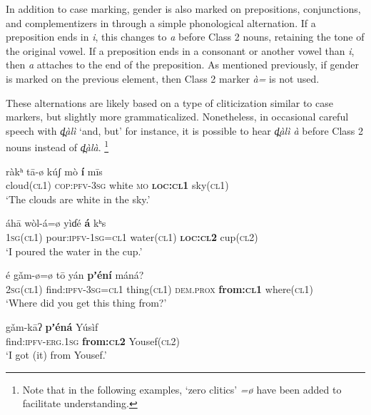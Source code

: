 \documentclass[output=collectionpaper,hidelinks]{langscibook}
\theoremstyle{remark}
\begin{document}
In addition to case marking, gender is also marked on prepositions,
conjunctions, and complementizers in  through a simple phonological
alternation.  If a preposition ends in \emph{i}, this changes to \emph{a} before
Class 2 nouns, retaining the tone of the original vowel.  If a preposition ends
in a consonant or another vowel than \emph{i}, then \emph{a} attaches to the end
of the preposition.  As mentioned previously, if gender is marked on the
previous element, then Class 2 marker \emph{à=} is not used.

These alternations are likely based on a type of cliticization similar to case
markers, but slightly more grammaticalized.  Nonetheless, in occasional careful
speech with \emph{d̪àlì} `and, but' for instance, it is possible to hear
\emph{d̪àlì à} before Class 2 nouns instead of \emph{d̪àlà}.%
\footnote{Note that in the following examples, `zero clitics' \textit{=ø} have been added to facilitate understanding.}

\ea
\gll  ràkʰ tā-ø kúʃ mò \textbf{í} mīs \\
 cloud(\textsc{cl1}) \textsc{cop}:\textsc{pfv}-\textsc{3sg} white \textsc{mo} \textbf{\textsc{loc:cl1}} sky(\textsc{cl1}) \\
\glt `The clouds are white in the sky.' \\
\z

\ea
\gll  áhā wòl-á=ø yìɗé \textbf{á} kʰ\oMidLow{}\hspace*{-.4mm}s \\
 \textsc{1sg}(\textsc{cl1}) pour:\textsc{ipfv}-\textsc{1sg}=\textsc{cl1} water(\textsc{cl1}) \textbf{\textsc{loc:cl2}} cup(\textsc{cl2}) \\
\glt `I poured the water in the cup.' \\
\z

\ea
\gll  é gǎm-ø=ø tō yán \textbf{pʼéní} máná? \\
 \textsc{2sg}(\textsc{cl1}) find:\textsc{ipfv}-\textsc{3sg}=\textsc{cl1} thing(\textsc{cl1}) \textsc{dem.prox} \textbf{from:\textsc{cl1}} where(\textsc{cl1}) \\
\glt `Where did you get this thing from?' \\
\z

\ea
\gll  gǎm-kāʔ \textbf{pʼéná} Yúsìf \\
 find:\textsc{ipfv}-\textsc{erg.1sg} \textbf{from:\textsc{cl2}} Yousef(\textsc{cl2}) \\
\glt `I got (it) from Yousef.' \\
\z
\end{document}
